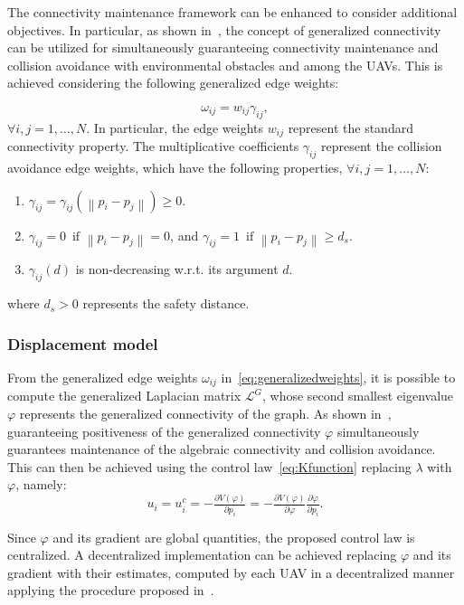 The connectivity maintenance framework can be enhanced to consider additional objectives. In particular, as shown in~\cite{robuffogiordano2013}, the concept of generalized connectivity can be utilized for simultaneously guaranteeing connectivity maintenance and collision avoidance with environmental obstacles and among the UAVs. This is achieved considering the following generalized edge weights:

\begin{equation}
\omega_{ij} = w_{ij}\gamma_{ij},
\label{eq:generalizedweights}
\end{equation}
$\forall i,j = 1, \ldots, N$. In particular, the edge weights $w_{ij}$ represent the standard connectivity property. The multiplicative coefficients $\gamma_{ij}$ represent the collision avoidance edge weights, which have the following properties, $\forall i,j=1, \ldots, N$:

\begin{enumerate}
        \item $\gamma_{ij}=\gamma_{ij}\left(\left\|p_i-p_j\right\|\right)\geq0$. \label{property:cweights1}
		\item $\gamma_{ij}=0\,\,\,\mbox{if }\left\|p_i-p_j\right\| = 0$, and $\gamma_{ij}=1\,\,\,\mbox{if }\left\|p_i-p_j\right\| \geq d_{s}$. \label{property:cweights2}
		\item $\gamma_{ij}\left(d\right)$ is non-decreasing w.r.t. its argument $d$.\label{property:cweights4}
\end{enumerate}

where $d_s>0$ represents the safety distance. 

\subsubsection{Displacement model}



From the generalized edge weights $\omega_{ij}$ in~\eqref{eq:generalizedweights}, 
it is possible to compute the generalized Laplacian matrix $\mathcal{L}^G$, whose second smallest eigenvalue $\varphi$ represents the generalized connectivity of the graph. As shown in~\cite{robuffogiordano2013}, guaranteeing positiveness of the generalized connectivity $\varphi$ simultaneously guarantees maintenance of the algebraic connectivity 
and collision avoidance. This can then be achieved using the control law~\eqref{eq:Kfunction} replacing $\lambda$ with $\varphi$, namely:
\begin{equation}
{u}_i=u_i^c = -\tfrac{\partial V\left(\varphi\right)}{\partial p_i}=-\tfrac{\partial V\left(\varphi\right)}{\partial \varphi}\tfrac{\partial \varphi}{\partial p_i}.
\label{eq:genconnmaint}
\end{equation}

Since $\varphi$ and its gradient are global quantities, the proposed control law is centralized. A decentralized implementation can be achieved replacing $\varphi$ and its gradient with their estimates, computed by each UAV in a decentralized manner applying the procedure proposed in~\cite{sabattiniijrr2013}.
